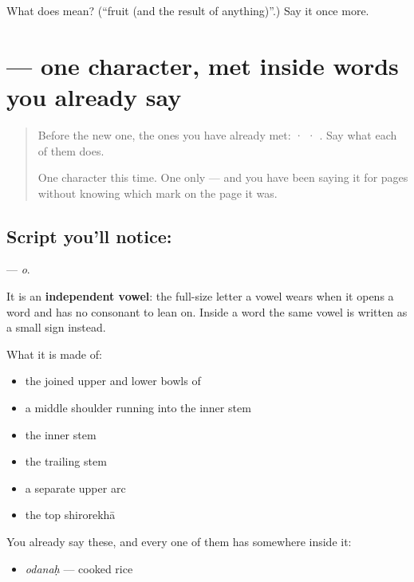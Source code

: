 \begin{tcolorbox}[breakable,colback=teal!4,colframe=teal!35!black,title={Before you move on}]
What does  mean? (\textquotedblleft{}fruit (and the result of anything)\textquotedblright{}.) Say it once more.
\end{tcolorbox}
\section[\texorpdfstring{\sk{ओ} (o)}{ओ (o)}]{ — one character, met inside words you already say}

\label{lesson:SA-S123-letter-o}



\begin{quote}
Before the new one, the ones you have already met:  ·  · . Say what each of them does.

One character this time. One only — and you have been saying it for pages without knowing which mark on the page it was.
\end{quote}

\subsection*{Script you'll notice: }
\textbf{} — \emph{o}.

It is an \textbf{independent vowel}: the full-size letter a vowel wears when it opens a word and has no consonant to lean on. Inside a word the same vowel is written as a small sign instead.

What it is made of:

\begin{itemize}
\raggedright
  \item the joined upper and lower bowls of 
  \item a middle shoulder running into the inner stem
  \item the inner stem
  \item the trailing stem
  \item a separate upper arc
  \item the top shirorekhā
\end{itemize}

You already say these, and every one of them has  somewhere inside it:

\begin{itemize}
\raggedright
  \item \textbf{} \emph{odanaḥ} — cooked rice
\end{itemize}

